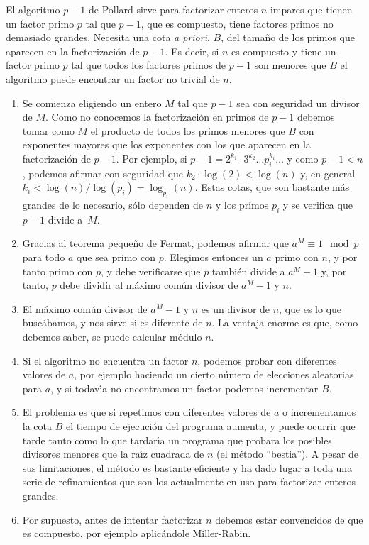 El algoritmo $p-1$ de Pollard sirve para factorizar enteros $n$ impares 
que tienen un factor primo $p$ tal que $p-1$, que es compuesto, tiene factores
primos no demasiado grandes. Necesita una cota {\itshape a priori}, $B$, del
tama\~no de los primos que aparecen en la factorizaci\'on de $p-1$. Es decir, si
$n$ es compuesto y  tiene un factor 
primo  $p$ tal que todos los factores primos de $p-1$ son menores  que $B$ el
algoritmo puede encontrar  un factor no trivial de $n$. 
\begin{enumerate}
 \item Se comienza eligiendo un  entero $M$ tal que $p-1$ sea con seguridad un
divisor de $M$. Como no conocemos la factorizaci\'on en primos de $p-1$ debemos
tomar como $M$ el producto de todos los primos menores que $B$ con exponentes
mayores que los exponentes con los que aparecen en la factorizaci\'on de $p-1$.
Por ejemplo, si $p-1=2^{k_1}\cdot 3^{k_2}\dots p_i^{k_i}\dots $ y como $p-1<n$,
podemos afirmar con seguridad que 
$k_2\cdot \log(2)< \log(n)$ y, en general $k_i<\log(n)/\log(p_i)= 
\log_{p_i}(n)$.
Estas cotas, que son bastante m\'as grandes de lo necesario, s\'olo dependen de
$n$ y los primos $p_i$ y se verifica que $p-1$ divide a~$M$.

\item Gracias al teorema peque\~no de Fermat, podemos afirmar que 
$a^M \equiv 1\mod p$ para todo $a$ que sea primo con $p$. Elegimos entonces un 
$a$ primo con
$n$, y por tanto primo con $p$, y debe verificarse que $p$ tambi\'en divide a
$a^M-1$ y, por tanto, $p$ debe dividir al m\'aximo com\'un divisor de $a^M-1$ y
$n$. 
\item El m\'aximo com\'un divisor de $a^M-1$ y $n$ es un divisor de $n$, que es
lo que busc\'abamos, y nos sirve si es diferente de $n$.
La ventaja enorme es que, como debemos saber, se puede calcular m\'odulo $n$.
\item Si el algoritmo no encuentra un factor $n$, podemos probar con diferentes
valores de $a$, por ejemplo haciendo un cierto n\'umero de elecciones aleatorias
para $a$, y si todav\'{\i}a no encontramos un factor  podemos incrementar $B$. 
\item El problema es que si repetimos con diferentes valores de $a$ o
incrementamos la cota $B$ el tiempo de ejecuci\'on del programa aumenta, y puede
ocurrir que tarde tanto como lo que tardar\'{\i}a un programa que probara los
posibles divisores menores que la ra\'{\i}z cuadrada de $n$ (el m\'etodo
``bestia'').  A pesar de sus limitaciones, el m\'etodo es bastante eficiente y 
ha
dado lugar a toda una serie de refinamientos que son los actualmente en
uso para factorizar enteros grandes.
\item Por supuesto, antes de intentar factorizar $n$ debemos estar convencidos
de que es compuesto, por ejemplo aplic\'andole Miller-Rabin. 
\end{enumerate}


